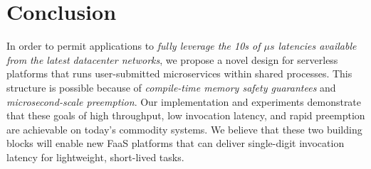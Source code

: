 \section{Conclusion}
\label{sec:concl}

In order to permit applications to \textit{fully leverage the 10s of $\mu{}s$
latencies available from the latest datacenter networks}, we propose a novel design
for serverless platforms that runs user-submitted microservices within shared
processes.  This structure is possible because of
\textit{compile-time memory safety guarantees} and \textit{microsecond-scale
preemption}.  Our implementation and experiments demonstrate that these goals of
high throughput, low invocation latency, and rapid preemption are achievable
on today's commodity systems.  We believe that these
two building blocks will enable new FaaS platforms that can deliver single-digit
invocation latency for lightweight, short-lived tasks.

